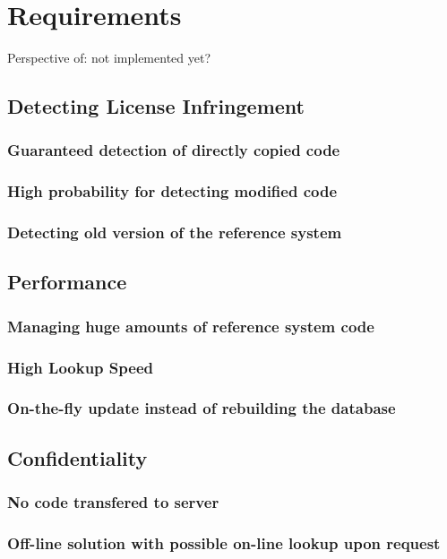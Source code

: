 
\chapter{Requirements}\label{chapter:requirements}
Perspective of: not implemented yet?

\section{Detecting License Infringement}
\subsection{Guaranteed detection of directly copied code}
\subsection{High probability for detecting modified code} %
\subsection{Detecting old version of the reference system}

\section{Performance}
\subsection{Managing huge amounts of reference system code}
\subsection{High Lookup Speed}
\subsection{On-the-fly update instead of rebuilding the database}

\section{Confidentiality}
\subsection{No code transfered to server}
\subsection{Off-line solution with possible on-line lookup upon request}